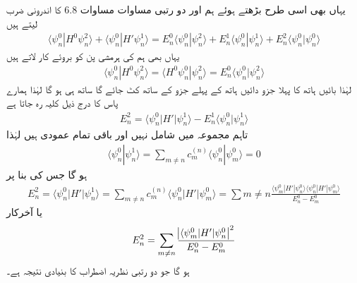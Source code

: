 
یہاں بھی اسی طرح بڑھتے ہوئے ہم  اور دو رتبی مساوات مساوات 6.8 کا اندرونی ضرب لیتے ہیں 
\begin{align*}
\langle \psi_n^0 | H^0 \psi_n^2 \rangle + \langle \psi_n^0 | H' \psi_n^1 \rangle = E_n^0 \langle \psi_n^0 | \psi_n^2 \rangle + E_n^1 \langle \psi_n^0 | \psi_n^1 \rangle + E_n^2 \langle \psi_n^0 | \psi_n^0 \rangle
\end{align*}
یہاں بھی ہم  کی ہرمشی پن کو بروئے کار لاتے ہیں 
\begin{align*}
\langle \psi_n^0 | H^0 \psi_n^2 \rangle = \langle H^0 \psi_n^0 | \psi_n^2 \rangle = E_n^0 \langle \psi_n^0 | \psi_n^2 \rangle
\end{align*}
 لہٰذا  بائیں ہاتھ کا پہلا جزو دائیں ہاتھ کے پہلے جزو کے ساتھ کٹ جائے گا   ساتھ   ہی  ہو گا   لہٰذا  ہمارے پاس  کا درج ذیل  کلیہ رہ جاتا ہے 
\begin{align}
E_n^2 = \langle \psi_n^0 | H' | \psi_n^1 \rangle - E_n^1 \langle \psi_n^0 | \psi_n^1 \rangle
\end{align}
تاہم  مجموعہ  میں  شامل نہیں  اور  باقی تمام عمودی ہیں  لہٰذا  
\begin{align*}
\langle \psi_n^0 | \psi_n^1 \rangle  = \sum_{m \ne n} c_m^{(n)} \langle \psi_n^0 | \psi_m^0 \rangle = 0
\end{align*}
 ہو گا جس کی بنا پر 
\begin{align*}
E_n^2 = \langle \psi_n^0 | H' | \psi_n^1 \rangle = \sum_{m \ne n} c_m^{(n)} \langle \psi_n^0 | H' | \psi_m^0 \rangle = \sum{m \ne n} \frac{\langle \psi_m^0 | H' | \psi_n^0 \rangle \langle \psi_n^0 | H' | \psi_m^0 \rangle }{E_n^0 - E_m^0}
\end{align*}
یا  آخرکار
\begin{align}
E_n^2 = \sum_{m \ne n} \frac{ \abs{ \langle \psi_m^0 | H' | \psi_n^0 }^2 }{E_n^0 - E_m^0}
\end{align}
 ہو گا جو دو رتبی نظریہ اضطراب کا بنیادی نتیجہ ہے۔

